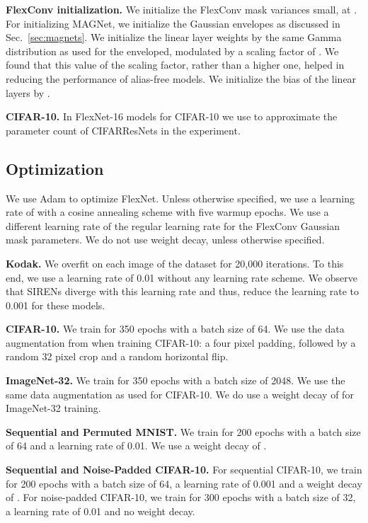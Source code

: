\documentclass{article} \usepackage{iclr2022_conference,times}
\begin{document}
\textbf{FlexConv initialization.} We initialize the FlexConv mask variances small, at . For initializing MAGNet, we initialize the Gaussian envelopes as discussed in Sec.~\ref{sec:magnets}. We initialize the linear layer weights by the same Gamma distribution as used for the enveloped, modulated by a scaling factor of . We found that this value of the scaling factor, rather than a higher one, helped in reducing the performance of alias-free models. We initialize the bias of the linear layers by .

\textbf{CIFAR-10.} In FlexNet-16 models for CIFAR-10 we use  to approximate the parameter count of CIFARResNets in the experiment.

\subsection{Optimization}
\label{sec:flexnet-optimization}

We use Adam \citep{kingma2014adam} to optimize FlexNet. Unless otherwise specified, we use a learning rate of  with a cosine annealing scheme \citep{loshchilov2016sgdr} with five warmup epochs. We use a different learning rate of  the regular learning rate for the FlexConv Gaussian mask parameters. We do not use weight decay, unless otherwise specified.

\textbf{Kodak.} We overfit on each image of the dataset for 20,000 iterations. To this end, we use a learning rate of 0.01 without any learning rate scheme. We observe that SIRENs diverge with this learning rate and thus, reduce the learning rate to 0.001 for these models.

\textbf{CIFAR-10.} We train for 350 epochs with a batch size of 64. We use the data augmentation from \citet{he2016deep} when training CIFAR-10: a four pixel padding, followed by a random 32 pixel crop and a random horizontal flip.

\textbf{ImageNet-32.} We train for 350 epochs with a batch size of 2048. We use the same data augmentation as used for CIFAR-10. We do use a weight decay of  for ImageNet-32 training.

\textbf{Sequential and Permuted MNIST.} We train for 200 epochs with a batch size of 64 and a learning rate of 0.01. We use a weight decay of .

\textbf{Sequential and Noise-Padded CIFAR-10.} For sequential CIFAR-10, we train for 200 epochs with a batch size of 64, a learning rate of 0.001 and a weight decay of . For noise-padded CIFAR-10, we train for 300 epochs with a batch size of 32, a learning rate of 0.01 and no weight decay.
\end{document}
